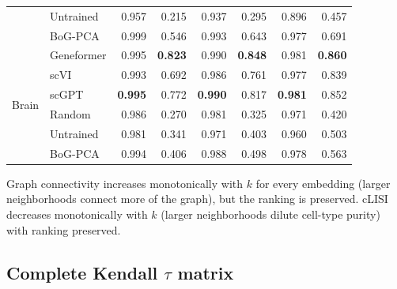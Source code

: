 \documentclass[11pt]{article}
\begin{document}
\begin{table}[h!]
\begin{tabular}{@{}ll rr rr rr@{}}
 & Untrained  & 0.957 & 0.215 & 0.937 & 0.295 & 0.896 & 0.457 \\
 & BoG-PCA    & 0.999 & 0.546 & 0.993 & 0.643 & 0.977 & 0.691 \\
\midrule
\multirow{6}{*}{Brain}
 & Geneformer & 0.995 & \textbf{0.823} & 0.990 & \textbf{0.848} & 0.981 & \textbf{0.860} \\
 & scVI       & 0.993 & 0.692 & 0.986 & 0.761 & 0.977 & 0.839 \\
 & scGPT      & \textbf{0.995} & 0.772 & \textbf{0.990} & 0.817 & \textbf{0.981} & 0.852 \\
 & Random     & 0.986 & 0.270 & 0.981 & 0.325 & 0.971 & 0.420 \\
 & Untrained  & 0.981 & 0.341 & 0.971 & 0.403 & 0.960 & 0.503 \\
 & BoG-PCA    & 0.994 & 0.406 & 0.988 & 0.498 & 0.978 & 0.563 \\
\bottomrule
\end{tabular}
\end{table}

Graph connectivity increases monotonically with $k$ for every embedding (larger neighborhoods connect more of the graph), but the ranking is preserved. cLISI decreases monotonically with $k$ (larger neighborhoods dilute cell-type purity) with ranking preserved.

\subsection{Complete Kendall $\tau$ matrix}
\end{document}

